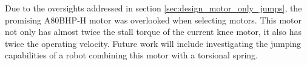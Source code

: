 Due to the oversights addressed in section \ref{sec:design_motor_only_jumps}, the promising A80BHP-H motor was overlooked when selecting motors. This motor not only has almost twice the stall torque of the current knee motor, it also has twice the operating velocity. Future work will include investigating the jumping capabilities of a robot combining this motor with a torsional spring.
